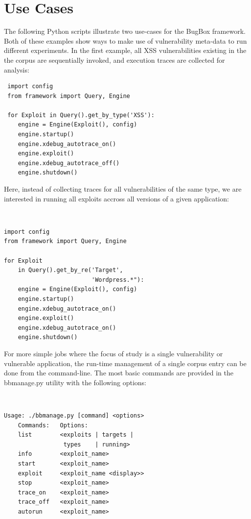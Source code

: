 \documentclass[letterpaper,twocolumn,10pt]{article}
\begin{document}
\section{Use Cases}

The following Python scripts illustrate two use-cases for the BugBox framework. Both of these examples show ways to make use of vulnerability meta-data to run different experiments. In the first example, all XSS vulnerabilities existing in the the corpus are sequentially invoked, and execution traces are collected for analysis:


\begin{minipage}{\textwidth}
{\tt \footnotesize

\begin{lstlisting}
 import config
 from framework import Query, Engine
 
 for Exploit in Query().get_by_type('XSS'):
    engine = Engine(Exploit(), config)
    engine.startup()
    engine.xdebug_autotrace_on()
    engine.exploit()
    engine.xdebug_autotrace_off()
    engine.shutdown()
\end{lstlisting}
}
\end{minipage}


Here, instead of collecting traces for all vulnerabilities of the same type, we are interested in running all exploits accross all versions of a given application:

\begin{minipage}{\textwidth}
{\tt \footnotesize
\begin{lstlisting}
import config
from framework import Query, Engine

for Exploit 
    in Query().get_by_re('Target', 
                         'Wordpress.*"):
    engine = Engine(Exploit(), config)
    engine.startup()
    engine.xdebug_autotrace_on()
    engine.exploit()
    engine.xdebug_autotrace_on()
    engine.shutdown()
\end{lstlisting}
}
\end{minipage}

For more simple jobs where the focus of study is a single vulnerability or vulnerable application, the run-time management of a single corpus entry can be done from the command-line. The most basic commands are provided in the bbmanage.py utility with the following options:

{\tt \footnotesize
\begin{verbatim}
Usage: ./bbmanage.py [command] <options>
    Commands:   Options:
    list        <exploits | targets | 
                 types    | running>
    info        <exploit_name>
    start       <exploit_name>
    exploit     <exploit_name <display>>
    stop        <exploit_name>
    trace_on    <exploit_name>
    trace_off   <exploit_name>
    autorun     <exploit_name>
\end{verbatim}
}
\end{document}
